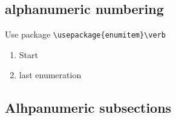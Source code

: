 \subsection{alphanumeric numbering}
Use package \verb+\usepackage{enumitem}\verb+
\begin{enumerate}[label=(\alph*)]
    \item Start
    \item last enumeration
\end{enumerate}

\subsection{Alhpanumeric subsections}
\renewcommand{\thepart}{\Alph{part}}
\renewcommand{\thesection}{\arabic{section}}
\renewcommand{\thesubsection}{\alph{subsection})}
\renewcommand{\thesubsubsection}{\alph{subsection}\alph{subsubsection})}